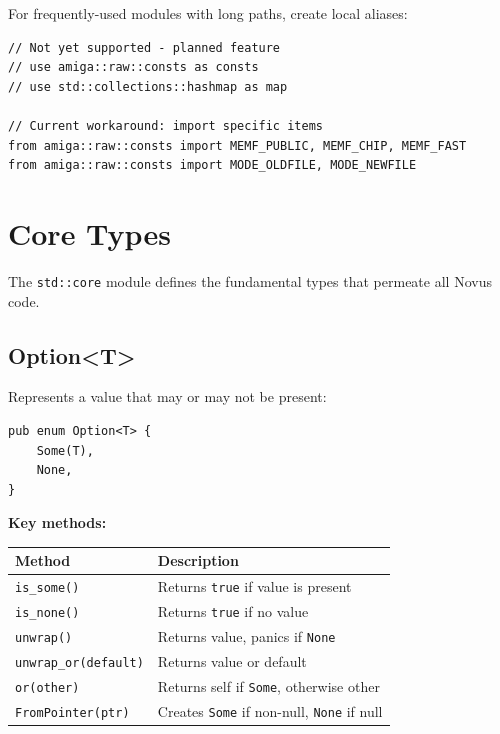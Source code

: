For frequently-used modules with long paths, create local aliases:

\begin{lstlisting}
// Not yet supported - planned feature
// use amiga::raw::consts as consts
// use std::collections::hashmap as map

// Current workaround: import specific items
from amiga::raw::consts import MEMF_PUBLIC, MEMF_CHIP, MEMF_FAST
from amiga::raw::consts import MODE_OLDFILE, MODE_NEWFILE
\end{lstlisting}

\section{Core Types}
\label{sec:stdlib-core-types}

The \texttt{std::core} module defines the fundamental types that permeate all Novus code.

\subsection{Option<T>}

Represents a value that may or may not be present:

\begin{lstlisting}
pub enum Option<T> {
    Some(T),
    None,
}
\end{lstlisting}

\textbf{Key methods:}

\begin{center}
\begin{tabular}{lp{8cm}}
\textbf{Method} & \textbf{Description} \\
\hline
\texttt{is\_some()} & Returns \texttt{true} if value is present \\
\texttt{is\_none()} & Returns \texttt{true} if no value \\
\texttt{unwrap()} & Returns value, panics if \texttt{None} \\
\texttt{unwrap\_or(default)} & Returns value or default \\
\texttt{or(other)} & Returns self if \texttt{Some}, otherwise other \\
\texttt{FromPointer(ptr)} & Creates \texttt{Some} if non-null, \texttt{None} if null \\
\end{tabular}
\end{center}

